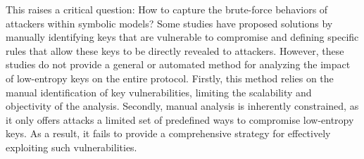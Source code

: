 \documentclass[../main.tex]{subfiles}  %
\begin{document}
This raises a critical question: How to capture the brute-force behaviors of attackers within symbolic models?
Some studies\cite{shi2023blesc, claverie2023tamarin} have proposed solutions by manually identifying keys that are vulnerable to compromise and defining specific rules that allow these keys to be directly revealed to attackers.
However, these studies do not provide a general or automated method for analyzing the impact of low-entropy keys on the entire protocol. 
Firstly, this method relies on the manual identification of key vulnerabilities, limiting the scalability and objectivity of the analysis.
Secondly, manual analysis is inherently constrained, as it only offers attacks a limited set of predefined ways to compromise low-entropy keys.
As a result, it fails to provide a comprehensive strategy for effectively exploiting such vulnerabilities.
\end{document}
